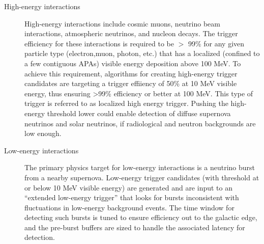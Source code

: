 \begin{description}
\item[High-energy interactions] High-energy interactions include cosmic muons, neutrino beam interactions, atmospheric neutrinos, and nucleon decays. 
  The trigger efficiency for these interactions is required to be $>$ 99\% for any given particle type (electron,muon, photon, etc.) that has a localized (confined to a few contiguous APAs) visible energy deposition above 100 MeV.
  To achieve this requirement, algorithms for creating high-energy trigger candidates are targeting a trigger effiiency of 50\% at 10 MeV visible energy, thus ensuring >99\% efficiency or better at 100 MeV.
  This type of trigger is referred to as localized high energy trigger. 
  Pushing the high-energy threshold lower could enable detection of diffuse supernova neutrinos and solar neutrinos, if radiological and neutron backgrounds are low enough.

\item[Low-energy interactions] The primary physics target for
  low-energy interactions is a neutrino burst from a nearby supernova. 
  Low-energy trigger candidates (with threshold at or below 10 MeV visible energy) are generated and are input to an ``extended low-energy trigger'' that looks for bursts inconsistent with fluctuations in low-energy background events. 
  The time window for detecting such bursts is tuned to ensure efficiency out to the galactic edge, and the pre-burst buffers are sized to handle the associated latency for detection.

\end{description}



